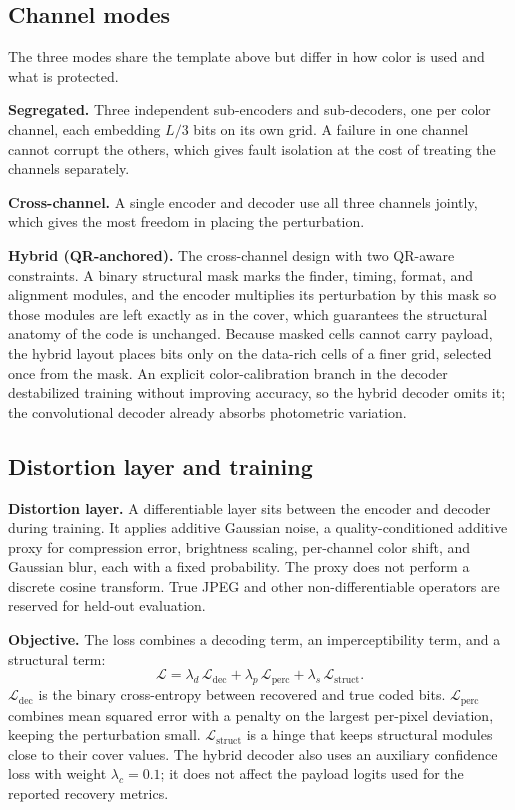 \documentclass[conference]{IEEEtran}
\begin{document}
\subsection{Channel modes}
\label{ssec:modes}
The three modes share the template above but differ in how color is used and what is
protected.

\textbf{Segregated.} Three independent sub-encoders and sub-decoders, one per color
channel, each embedding $L/3$ bits on its own grid. A failure in one channel cannot
corrupt the others, which gives fault isolation at the cost of treating the channels
separately.

\textbf{Cross-channel.} A single encoder and decoder use all three channels jointly, which
gives the most freedom in placing the perturbation.

\textbf{Hybrid (QR-anchored).} The cross-channel design with two QR-aware constraints. A
binary structural mask marks the finder, timing, format, and alignment modules, and the
encoder multiplies its perturbation by this mask so those modules are left exactly as in
the cover, which guarantees the structural anatomy of the code is unchanged. Because masked
cells cannot carry payload, the hybrid layout places bits only on the data-rich cells of a
finer grid, selected once from the mask. An explicit color-calibration branch in the
decoder destabilized training without improving accuracy, so the hybrid decoder omits it;
the convolutional decoder already absorbs photometric variation.

\subsection{Distortion layer and training}
\textbf{Distortion layer.} A differentiable layer sits between the encoder and decoder
during training. It applies additive Gaussian noise, a quality-conditioned additive proxy
for compression error, brightness scaling, per-channel color shift, and Gaussian blur,
each with a fixed probability. The proxy does not perform a discrete cosine transform.
True JPEG and other non-differentiable operators are reserved for held-out evaluation.

\textbf{Objective.} The loss combines a decoding term, an imperceptibility term, and a
structural term:
\begin{equation}
\mathcal{L} = \lambda_d\,\mathcal{L}_{\text{dec}} + \lambda_p\,\mathcal{L}_{\text{perc}}
            + \lambda_s\,\mathcal{L}_{\text{struct}}.
\end{equation}
$\mathcal{L}_{\text{dec}}$ is the binary cross-entropy between recovered and true coded
bits. $\mathcal{L}_{\text{perc}}$ combines mean squared error with a penalty on the largest
per-pixel deviation, keeping the perturbation small. $\mathcal{L}_{\text{struct}}$ is a
hinge that keeps structural modules close to their cover values. The hybrid decoder also
uses an auxiliary confidence loss with weight $\lambda_c=0.1$; it does not affect the
payload logits used for the reported recovery metrics.
\end{document}
